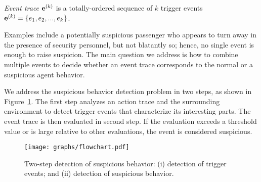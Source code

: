 \begin{definition}
	\emph{Event trace} $\mathbf{e}^{\scriptsize(k)}$ is a totally-ordered sequence of $k$ trigger events $\mathbf{e}^{\scriptsize(k)}=\{e_1,e_2,...,e_k\}$.
\end{definition}

Examples include a potentially suspicious passenger who appears to turn away in the presence of security personnel, but not blatantly so; hence, no single event is enough to raise suspicion.
The main question we address is how to combine multiple events to decide whether an event trace corresponds to the normal or a suspicious agent behavior. 


We address the suspicious behavior detection problem in two steps, as shown in Figure~\ref{fig:two-step-detection}. The first step analyzes an action trace and the surrounding environment to detect trigger events that characterize its interesting parts. The event trace is then evaluated in second step. If the evaluation exceeds a threshold value or is large relative to other evaluations, the event is considered suspicious.


\begin{figure}[!ht]
\centering
\texttt{[image: graphs/flowchart.pdf]}
\caption{Two-step detection of suspicious behavior: (i) detection of trigger events; and (ii) detection of suspicious behavior.}
\label{fig:two-step-detection}
\end{figure}



